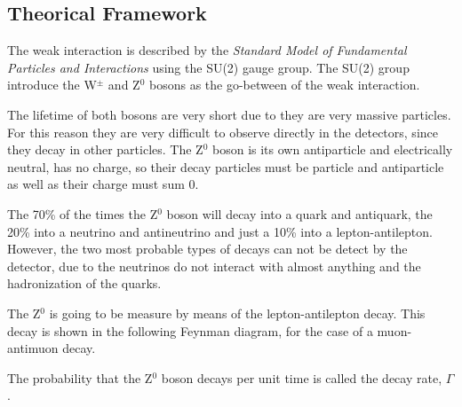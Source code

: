 \documentclass[twoside]{article}
\begin{document}
	\begin{multicols}{2} %

		\section{Theorical Framework} %
			\label{sec:TFW}
							 
			The weak interaction is described by the \textit{Standard Model of Fundamental Particles and Interactions} using the SU(2) gauge group. The SU(2) group introduce the W$^{\pm}$ and Z$^0$ bosons as the go-between of the weak interaction.

			The lifetime of both bosons are very short due to they are very massive particles. For this reason they are very difficult to observe directly in the detectors, since they decay in other particles.  The Z$^0$ boson is its own antiparticle and electrically neutral, has no charge, so their decay particles must be particle and antiparticle as well as their charge must sum 0.

			The 70\% of the times the Z$^0$ boson will decay into a quark and antiquark, the 20\% into a neutrino and antineutrino and just a 10\% into a lepton-antilepton. However, the two most probable types of decays can not be detect by the detector, due to the neutrinos do not interact with almost anything and the hadronization of the quarks. 

			The Z$^0$ is going to be measure by means of the lepton-antilepton decay. This decay is shown in the following Feynman diagram, for the case of a muon-antimuon decay.


				The probability that the Z$^0$ boson decays per unit time is called the decay rate, $\Gamma$.


\end{multicols}
\end{document}

